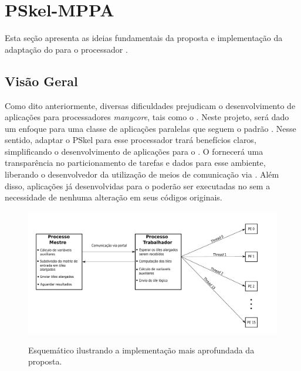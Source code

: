 \chapter{PSkel-MPPA}
\label{cha:proposta}

Esta seção apresenta as ideias fundamentais da proposta e implementação
da adaptação do \fw \pskel para o processador \mppa.

\section{Visão Geral}

Como dito anteriormente, diversas dificuldades prejudicam o desenvolvimento de aplicações para
processadores \textit{manycore}, tais como o \mppa. Neste projeto, será dado um enfoque para
uma classe de aplicações paralelas que seguem o padrão \stencil. Nesse sentido, adaptar
o \fw PSkel para esse processador trará benefícios claros, simplificando o desenvolvimento
de aplicações \stencil para o \mppa. O \fw fornecerá uma transparência
no particionamento de tarefas e dados para esse ambiente, liberando o desenvolvedor
da utilização de meios de comunicação via \noc. Além disso, aplicações já desenvolvidas para o
\fw poderão ser executadas no \mppa sem a necessidade de nenhuma alteração em
seus códigos originais.




\begin{figure}[t]
    \centering
    \caption{Esquemático ilustrando a implementação mais aprofundada da proposta.}
    \includegraphics[width=\textwidth, height=!]{figs/visaoGeralPSKELMPPATrabalhador.pdf} \\

    \label{fig:visaoGeral}
\end{figure}


